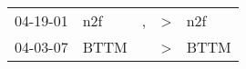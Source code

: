 \begin{supertabular}{p{0.07\textwidth}p{0.06\textwidth}p{0.02\textwidth}p{0.02\textwidth}p{0.06\textwidth}}
 04-19-01\textsuperscript{} &   n2f\textsuperscript{} &  , &  \textgreater &   n2f\textsuperscript{} \\
 04-03-07\textsuperscript{} &  BTTM\textsuperscript{} &    &  \textgreater &  BTTM\textsuperscript{} \\
\end{supertabular}
